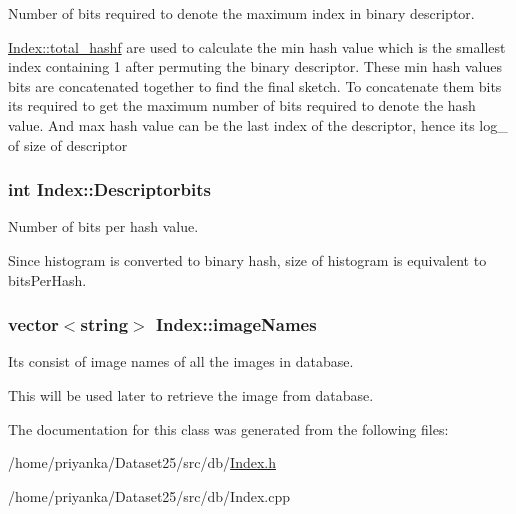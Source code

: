 \-Number of bits required to denote the maximum index in binary descriptor. 

\hyperlink{classIndex_a7e25594ed3a2d5af48a3370c36ac6481}{\-Index\-::total\-\_\-hashf} are used to calculate the min hash value which is the smallest index containing 1 after permuting the binary descriptor. \-These min hash values bits are concatenated together to find the final sketch. \-To concatenate them bits its required to get the maximum number of bits required to denote the hash value. \-And max hash value can be the last index of the descriptor, hence its log\-\_ of size of descriptor \hypertarget{classIndex_ac11c8f73f786ae87d455b214d6978fd1}{
\subsubsection[{\-Descriptorbits}]{\setlength{\rightskip}{0pt plus 5cm}int {\bf \-Index\-::\-Descriptorbits}}}\label{classIndex_ac11c8f73f786ae87d455b214d6978fd1}


\-Number of bits per hash value. 

\-Since histogram is converted to binary hash, size of histogram is equivalent to bits\-Per\-Hash. \hypertarget{classIndex_a10d91af933c37e605b1d9bd1a3995f8c}{
\subsubsection[{image\-Names}]{\setlength{\rightskip}{0pt plus 5cm}vector$<$string$>$ {\bf \-Index\-::image\-Names}}}\label{classIndex_a10d91af933c37e605b1d9bd1a3995f8c}


\-Its consist of image names of all the images in database. 

\-This will be used later to retrieve the image from database. 

\-The documentation for this class was generated from the following files\-:\begin{DoxyCompactItemize}
\item 
/home/priyanka/\-Dataset25/src/db/\hyperlink{Index_8h}{\-Index.\-h}\item 
/home/priyanka/\-Dataset25/src/db/\-Index.\-cpp\end{DoxyCompactItemize}
